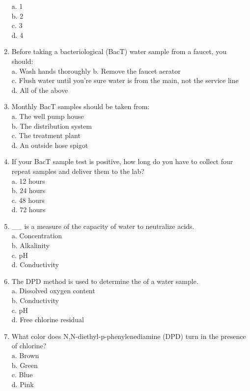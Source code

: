 \begin{enumerate}[1.]
a. 1\\
b. 2\\
c. 3\\
d. 4\\
\item Before taking a bacteriological (BacT) water sample from a faucet, you should:\\
a. Wash hands thoroughly b. Remove the faucet aerator\\
c. Flush water until you're sure water is from the main, not the service line\\
d. All of the above\\
\item Monthly BacT samples should be taken from:\\
a. The well pump house\\
b. The distribution system\\
c. The treatment plant\\
d. An outside hose spigot\\
\item If your BacT sample test is positive, how long do you have to collect four repeat samples and deliver them to the lab?\\
a. 12 hours\\
b. 24 hours\\
c. 48 hours\\
d. 72 hours\\
\item \_\_ is a measure of the capacity of water to neutralize acids.\\
a. Concentration\\
b. Alkalinity\\
c. $\mathrm{pH}$\\
d. Conductivity\\
\item The DPD method is used to determine the of a water sample.\\
a. Dissolved oxygen content\\
b. Conductivity\\
c. $\mathrm{pH}$\\
d. Free chlorine residual\\
\item What color does N,N-diethyl-p-phenylenediamine (DPD) turn in the presence of chlorine?\\
a. Brown\\
b. Green\\
c. Blue\\
d. Pink\\

\end{enumerate}
